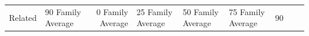 \begin{table}[t]
{\begin{tabular}{llrllllll}
Related & 90%
Family Average & 0%
Family Average & 25%
Family Average & 50%
Family Average & 75%
Family Average & 90%
\bottomrule
\end{tabular}
}
\end{table}

